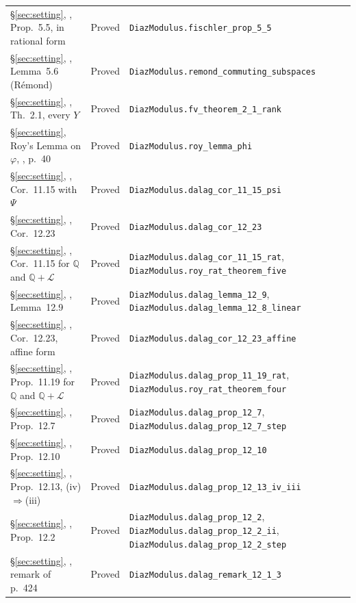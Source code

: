 \documentclass[11pt,a4paper]{article}
\theoremstyle{plain}
\theoremstyle{definition}
\newcommand{\Q}{\mathbb{Q}}
\newcommand{\Logs}{\mathcal{L}}
\begin{document}
\begin{center}
\begin{longtable}{@{}llp{6.2cm}@{}}
\S\ref{sec:setting}, \cite{fischler-2001}, Prop.~5.5, in rational form & Proved & \nolinkurl{DiazModulus.fischler_prop_5_5} \\
\S\ref{sec:setting}, \cite{fischler-2001}, Lemma~5.6 (R\'emond) & Proved & \nolinkurl{DiazModulus.remond_commuting_subspaces} \\
\S\ref{sec:setting}, \cite{waldschmidt-2005b}, Th.~2.1, every $Y$ & Proved & \nolinkurl{DiazModulus.fv_theorem_2_1_rank} \\
\S\ref{sec:setting}, Roy's Lemma on $\varphi$, \cite{roy-1992}, p.~40 & Proved & \nolinkurl{DiazModulus.roy_lemma_phi} \\
\S\ref{sec:setting}, \cite{waldschmidt-book}, Cor.~11.15 with $\Psi$ & Proved & \nolinkurl{DiazModulus.dalag_cor_11_15_psi} \\
\S\ref{sec:setting}, \cite{waldschmidt-book}, Cor.~12.23 & Proved & \nolinkurl{DiazModulus.dalag_cor_12_23} \\
\S\ref{sec:setting}, \cite{waldschmidt-book}, Cor.~11.15 for $\Q$ and $\Q+\Logs$ & Proved & \nolinkurl{DiazModulus.dalag_cor_11_15_rat}, \nolinkurl{DiazModulus.roy_rat_theorem_five} \\
\S\ref{sec:setting}, \cite{waldschmidt-book}, Lemma~12.9 & Proved & \nolinkurl{DiazModulus.dalag_lemma_12_9}, \nolinkurl{DiazModulus.dalag_lemma_12_8_linear} \\
\S\ref{sec:setting}, \cite{waldschmidt-book}, Cor.~12.23, affine form & Proved & \nolinkurl{DiazModulus.dalag_cor_12_23_affine} \\
\S\ref{sec:setting}, \cite{waldschmidt-book}, Prop.~11.19 for $\Q$ and $\Q+\Logs$ & Proved & \nolinkurl{DiazModulus.dalag_prop_11_19_rat}, \nolinkurl{DiazModulus.roy_rat_theorem_four} \\
\S\ref{sec:setting}, \cite{waldschmidt-book}, Prop.~12.7 & Proved & \nolinkurl{DiazModulus.dalag_prop_12_7}, \nolinkurl{DiazModulus.dalag_prop_12_7_step} \\
\S\ref{sec:setting}, \cite{waldschmidt-book}, Prop.~12.10 & Proved & \nolinkurl{DiazModulus.dalag_prop_12_10} \\
\S\ref{sec:setting}, \cite{waldschmidt-book}, Prop.~12.13, (iv)$\Rightarrow$(iii) & Proved & \nolinkurl{DiazModulus.dalag_prop_12_13_iv_iii} \\
\S\ref{sec:setting}, \cite{waldschmidt-book}, Prop.~12.2 & Proved & \nolinkurl{DiazModulus.dalag_prop_12_2}, \nolinkurl{DiazModulus.dalag_prop_12_2_ii}, \nolinkurl{DiazModulus.dalag_prop_12_2_step} \\
\S\ref{sec:setting}, \cite{waldschmidt-book}, remark of p.~424 & Proved & \nolinkurl{DiazModulus.dalag_remark_12_1_3} \\

\end{longtable}
\end{center}
\end{document}
